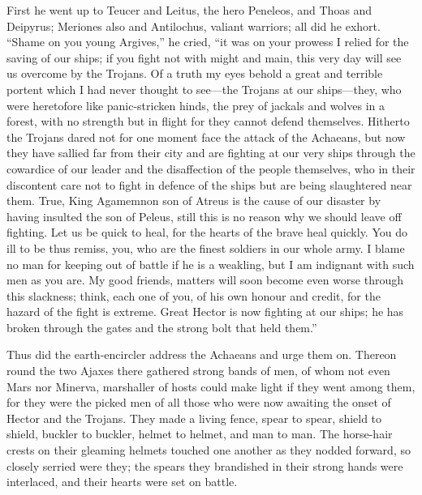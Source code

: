 First he went up to Teucer and Leitus, the hero Peneleos, and Thoas and
Deipyrus; Meriones also and Antilochus, valiant warriors; all did he
exhort. “Shame on you young Argives,” he cried, “it was on your prowess I
relied for the saving of our ships; if you fight not with might and main,
this very day will see us overcome by the Trojans. Of a truth my eyes
behold a great and terrible portent which I had never thought to see—the
Trojans at our ships—they, who were heretofore like panic-stricken
hinds, the prey of jackals and wolves in a forest, with no strength but in
flight for they cannot defend themselves. Hitherto the Trojans dared not
for one moment face the attack of the Achaeans, but now they have sallied
far from their city and are fighting at our very ships through the
cowardice of our leader and the disaffection of the people themselves, who
in their discontent care not to fight in defence of the ships but are
being slaughtered near them. True, King Agamemnon son of Atreus is the
cause of our disaster by having insulted the son of Peleus, still this is
no reason why we should leave off fighting. Let us be quick to heal, for
the hearts of the brave heal quickly. You do ill to be thus remiss, you,
who are the finest soldiers in our whole army. I blame no man for keeping
out of battle if he is a weakling, but I am indignant with such men as you
are. My good friends, matters will soon become even worse through this
slackness; think, each one of you, of his own honour and credit, for the
hazard of the fight is extreme. Great Hector is now fighting at our ships;
he has broken through the gates and the strong bolt that held them.”

Thus did the earth-encircler address the Achaeans and urge them on.
Thereon round the two Ajaxes there gathered strong bands of men, of whom
not even Mars nor Minerva, marshaller of hosts could make light if they
went among them, for they were the picked men of all those who were now
awaiting the onset of Hector and the Trojans. They made a living fence,
spear to spear, shield to shield, buckler to buckler, helmet to helmet,
and man to man. The horse-hair crests on their gleaming helmets touched
one another as they nodded forward, so closely serried were they; the
spears they brandished in their strong hands were interlaced, and their
hearts were set on battle.

